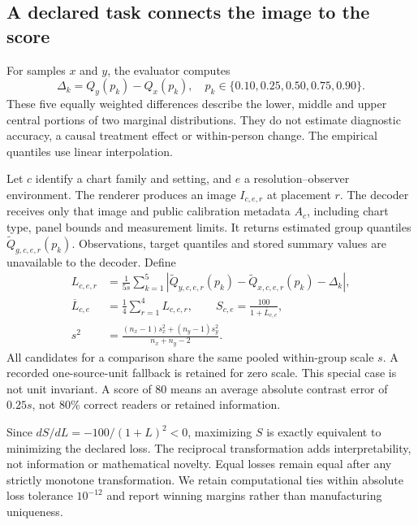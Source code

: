 \documentclass[11pt]{article}
\begin{document}
\subsection*{A declared task connects the image to the score}
For samples $x$ and $y$, the evaluator computes
\begin{equation}
\Delta_k=Q_y(p_k)-Q_x(p_k),\quad p_k\in\{0.10,0.25,0.50,0.75,0.90\}.
\label{eq:target}
\end{equation}
These five equally weighted differences describe the lower, middle and upper central portions of two marginal distributions. They do not estimate diagnostic accuracy, a causal treatment effect or within-person change. The empirical quantiles use linear interpolation.

Let $c$ identify a chart family and setting, and $e$ a resolution--observer environment. The renderer produces an image $I_{c,e,r}$ at placement $r$. The decoder receives only that image and public calibration metadata $A_c$, including chart type, panel bounds and measurement limits. It returns estimated group quantiles $\widetilde Q_{g,c,e,r}(p_k)$. Observations, target quantiles and stored summary values are unavailable to the decoder. Define
\begin{align}
L_{c,e,r}&=\frac{1}{5s}\sum_{k=1}^5|\widetilde Q_{y,c,e,r}(p_k)-\widetilde Q_{x,c,e,r}(p_k)-\Delta_k|,\\
\overline L_{c,e}&=\frac14\sum_{r=1}^4L_{c,e,r},\qquad S_{c,e}=\frac{100}{1+\overline L_{c,e}},\label{eq:score}\\
s^2&=\frac{(n_x-1)s_x^2+(n_y-1)s_y^2}{n_x+n_y-2}.
\end{align}
All candidates for a comparison share the same pooled within-group scale $s$. A recorded one-source-unit fallback is retained for zero scale. This special case is not unit invariant. A score of 80 means an average absolute contrast error of $0.25s$, not 80\% correct readers or retained information.

Since $dS/dL=-100/(1+L)^2<0$, maximizing $S$ is exactly equivalent to minimizing the declared loss. The reciprocal transformation adds interpretability, not information or mathematical novelty. Equal losses remain equal after any strictly monotone transformation. We retain computational ties within absolute loss tolerance $10^{-12}$ and report winning margins rather than manufacturing uniqueness.
\end{document}

